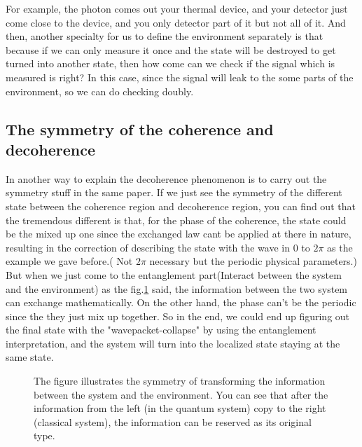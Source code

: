 \documentclass[final,1p,12pt]{elsarticle}
\begin{document}
For example, the photon comes out your thermal device, and your detector just come close to the device, and you only detector part of it but not all of it. And then, another specialty for us to define the environment separately is that because if we can only measure it once and the state will be destroyed to get turned into another state, then how come can we check if the signal which is measured is right? In this case, since the signal will leak to the some parts of the environment, so we can do checking doubly.\\

\subsection{The symmetry of the coherence and decoherence}
In another way to explain the decoherence phenomenon is to carry out the symmetry stuff in the same paper. If we just see the symmetry of the different state between the coherence region and decoherence region, you can find out that the tremendous different is that, for the phase of the coherence, the state could be the mixed up one since the exchanged law cant be applied at there in nature, resulting in the correction of describing the state with the wave in 0 to $2\pi$ as the example we gave before.( Not $2\pi$ necessary but the periodic physical parameters.) But when we just come to the entanglement part(Interact between the system and the environment) as the fig.\ref{8888} said, the information between the two system can exchange mathematically. On the other hand, the phase can't be the periodic since the they just mix up together. So in the end, we could end up figuring out the final state with the "wavepacket-collapse" by using the entanglement interpretation, and the system will turn into the localized state staying at the same state. \\
\begin{figure}
\begin{center}
\end{center}
\caption{The figure illustrates the symmetry of transforming the information between the system and the environment. You can see that after the information from the left (in the quantum system) copy to the right (classical system), the information can be reserved as its original type. }
\label{8888}
\end{figure}
\end{document}
